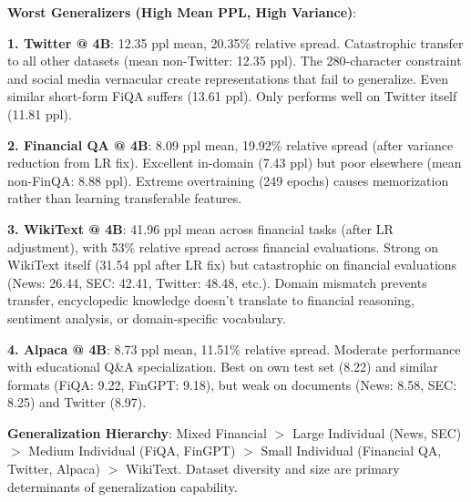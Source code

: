 \textbf{Worst Generalizers (High Mean PPL, High Variance)}:

\textbf{1. Twitter @ 4B}: 12.35 ppl mean, 20.35\% relative spread. Catastrophic transfer to all other datasets (mean non-Twitter: 12.35 ppl). The 280-character constraint and social media vernacular create representations that fail to generalize. Even similar short-form FiQA suffers (13.61 ppl). Only performs well on Twitter itself (11.81 ppl).

\textbf{2. Financial QA @ 4B}: 8.09 ppl mean, 19.92\% relative spread (after variance reduction from LR fix). Excellent in-domain (7.43 ppl) but poor elsewhere (mean non-FinQA: 8.88 ppl). Extreme overtraining (249 epochs) causes memorization rather than learning transferable features.

\textbf{3. WikiText @ 4B}: 41.96 ppl mean across financial tasks (after LR adjustment), with \~53\% relative spread across financial evaluations. Strong on WikiText itself (31.54 ppl after LR fix) but catastrophic on financial evaluations (News: 26.44, SEC: 42.41, Twitter: 48.48, etc.). Domain mismatch prevents transfer, encyclopedic knowledge doesn't translate to financial reasoning, sentiment analysis, or domain-specific vocabulary.

\textbf{4. Alpaca @ 4B}: 8.73 ppl mean, 11.51\% relative spread. Moderate performance with educational Q\&A specialization. Best on own test set (8.22) and similar formats (FiQA: 9.22, FinGPT: 9.18), but weak on documents (News: 8.58, SEC: 8.25) and Twitter (8.97).

\textbf{Generalization Hierarchy}: Mixed Financial $>$ Large Individual (News, SEC) $>$ Medium Individual (FiQA, FinGPT) $>$ Small Individual (Financial QA, Twitter, Alpaca) $>$ WikiText. Dataset diversity and size are primary determinants of generalization capability.

